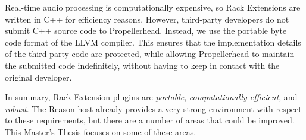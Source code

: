 Real-time audio processing is computationally expensive, so Rack Extensions are
written in C++ for efficiency reasons. However, third-party developers do not
submit C++ source code to Propellerhead. Instead, we use the portable byte code
format of the LLVM compiler. This ensures that the implementation details of the
third party code are protected, while allowing Propellerhead to maintain the
submitted code indefinitely, without having to keep in contact with the original
developer.

In summary, Rack Extension plugins are \emph {portable},
\emph {computationally efficient}, and \emph {robust}. The Reason host already
provides a very strong environment with respect to these requirements, but there
are a number of areas that could be improved. This Master’s Thesis focuses on
some of these areas.
